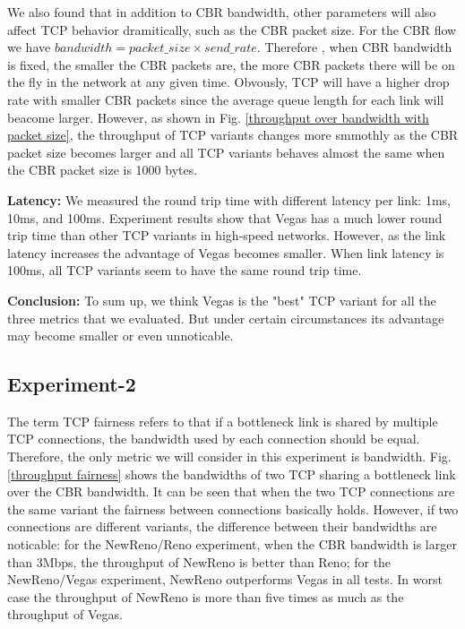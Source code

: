\documentclass[USenglish,oneside,twocolumn]{article}
\begin{document}
We also found that in addition to CBR bandwidth, other parameters will also affect TCP behavior dramitically, such as the CBR packet size. For the CBR flow we have \(bandwidth = packet\_size \times send\_rate\). Therefore , when CBR bandwidth is fixed, the smaller the CBR packets are, the more CBR packets there will be on the fly in the network at any given time. Obvously, TCP will have a higher drop rate with smaller CBR packets since the average queue length for each link will beacome larger. However, as shown in Fig. \ref{throughput over bandwidth with packet size}, the throughput of TCP variants changes more smmothly as the CBR packet size becomes larger and all TCP variants behaves almost the same when the CBR packet size is 1000 bytes. 

\noindent \textbf{Latency:} We measured the round trip time with different latency per link: 1ms, 10ms, and 100ms. Experiment results show that Vegas has a much lower round trip time than other TCP variants in high-speed networks. However, as the link latency increases the advantage of Vegas becomes smaller. When link latency is 100ms, all TCP variants seem to have the same round trip time.

\noindent \textbf{Conclusion:} To sum up, we think Vegas is the "best" TCP variant for all the three metrics that we evaluated. But under certain circumstances its advantage may become smaller or even unnoticable.


\subsection{Experiment-2}

The term TCP fairness refers to that if a bottleneck link is shared by multiple TCP connections, the bandwidth used by each connection should be equal. Therefore, the only metric we will consider in this experiment is bandwidth. Fig. \ref{throughput fairness} shows the bandwidths of two TCP sharing a bottleneck link over the CBR bandwidth. It can be seen that when the two TCP connections are the same variant the fairness between connections basically holds. However, if two connections are different variants, the difference between their bandwidths are noticable: for the NewReno/Reno experiment, when the CBR bandwidth is larger than 3Mbps, the throughput of NewReno is better than Reno; for the NewReno/Vegas experiment, NewReno outperforms Vegas in all tests. In worst case the throughput of NewReno is more than five times as much as the throughput of Vegas.
\end{document}
